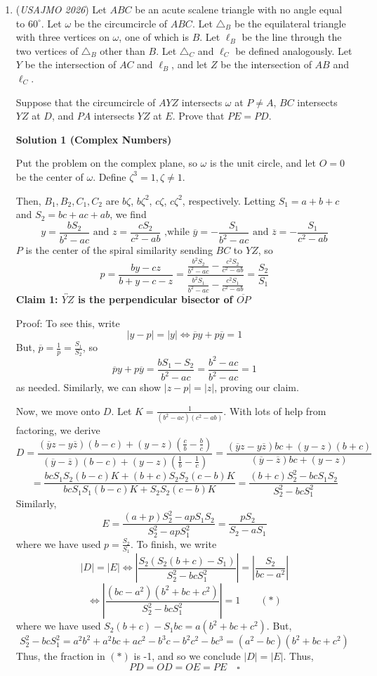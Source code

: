 \begin{enumerate}
 Note: The solution is incorrect but ~Continuum Math emphasized he will make an updated solution soon.

 


	\item (\textit{USAJMO 2026}) Let $ABC$ be an acute scalene triangle with no angle equal to $60^{\circ}$. Let $\omega$ be the circumcircle of $ABC$. Let $\triangle_B$ be the equilateral triangle with three vertices on $\omega$, one of which is $B$. Let $\ell_B$ be the line through the two vertices of $\triangle_B$ other than $B$. Let $\triangle_C$ and $\ell_C$ be defined analogously. Let $Y$ be the intersection of $AC$ and $\ell_B$, and let $Z$ be the intersection of $AB$ and $\ell_C$.


 Suppose that the circumcircle of $AYZ$ intersects $\omega$ at $P\neq A$, $BC$ intersects $YZ$ at $D$, and $PA$ intersects $YZ$ at $E$. Prove that $PE=PD$.


 



\textbf{Solution 1 (Complex Numbers)}

Put the problem on the complex plane, so $\omega$ is the unit circle, and let $O=0$ be the center of $\omega$. Define $\zeta^3=1, \zeta \neq 1$. 

 Then, $B_1, B_2, C_1, C_2$ are $b\zeta$, $b\zeta^2$, $c\zeta$, $c\zeta^2$, respectively. Letting $S_1=a+b+c$ and $S_2=bc+ac+ab$, we find 
 \[y=\frac{bS_2}{b^2-ac} \text{ and } z=\frac{cS_2}{c^2-ab} \text{ ,while } \overline{y}=-\frac{S_1}{b^2-ac} \text{ and } \overline{z}=-\frac{S_1}{c^2-ab}\] $P$ is the center of the spiral similarity sending $BC$ to $YZ$, so 
 \[p = \frac{by-cz}{b+y-c-z}=\frac{\frac{b^2S_2}{b^2-ac}-\frac{c^2S_2}{c^2-ab}}{\frac{b^2S_1}{b^2-ac}-\frac{c^2S_1}{c^2-ab}}=\frac{S_2}{S_1}\]\textbf{Claim 1: $\overleftrightarrow{YZ}$ is the perpendicular bisector of $\overline{OP}$}

 Proof: To see this, write 
 \[|y-p|=|y| \iff \overline{p}y+p\overline{y}=1\] But, $\overline{p}=\frac{1}{p}=\frac{S_1}{S_2}$, so 
 \[\overline{p}y+p\overline{y} = \frac{bS_1-S_2}{b^2-ac} = \frac{b^2-ac}{b^2-ac} = 1\] as needed. Similarly, we can show $|z-p|=|z|$, proving our claim.

 Now, we move onto $D$. Let $K=\frac{1}{(b^2-ac)(c^2-ab)}$. With lots of help from factoring, we derive 
 \[D=  \frac{(\overline{y}z-y\overline{z})(b-c) + (y-z)(\frac{c}{b}-\frac{b}{c})}{(\overline{y}-\overline{z})(b-c)+(y-z)(\frac{1}{b}-\frac{1}{c})} =\frac{(\overline{y}z-y\overline{z})bc + (y-z)(b+c)}{(\overline{y}-\overline{z})bc+(y-z)}\] 
 \[= \frac{bcS_1S_2(b-c)K+(b+c)S_2S_2(c-b)K}{bcS_1S_1(b-c)K+S_2S_2(c-b)K}=\frac{(b+c)S_2^2-bcS_1S_2}{S_2^2-bcS_1^2}\] Similarly, 
 \[E=\frac{(a+p)S_2^2-apS_1S_2}{S_2^2-apS_1^2}=\frac{pS_2}{S_2-aS_1}\] where we have used $p=\frac{S_2}{S_1}$. To finish, we write 
 \[|D|=|E|\iff \left| \frac{S_2(S_2(b+c)-S_1)}{S_2^2-bcS_1^2} \right|=\left| \frac{S_2}{bc-a^2}\right|\] 
 \[\iff \left| \frac{(bc-a^2)(b^2+bc+c^2)}{S_2^2-bcS_1^2}\right| = 1 \quad \quad (\ast)\] where we have used $S_2(b+c)-S_1bc=a(b^2+bc+c^2)$. But, 
 \[S_2^2-bcS_1^2 = a^2b^2+a^2bc+ac^2-b^3c-b^2c^2-bc^3 = (a^2-bc)(b^2+bc+c^2)\] Thus, the fraction in $(\ast)$ is -1, and so we conclude $|D|=|E|$. Thus, 
 \[PD=OD=OE=PE \quad \square\]


\end{enumerate}
